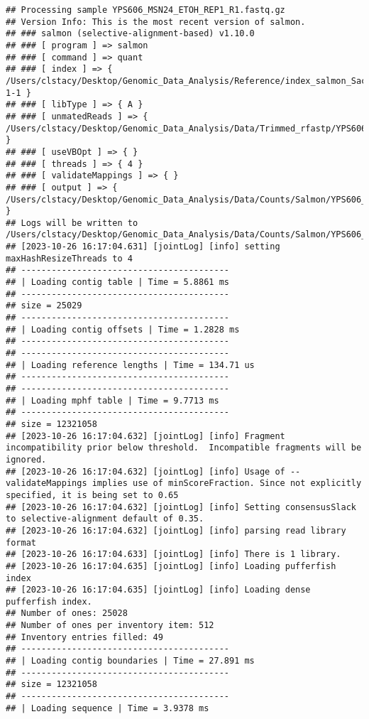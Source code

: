 \documentclass[
]{book}
\begin{document}
\begin{verbatim}
## Processing sample YPS606_MSN24_ETOH_REP1_R1.fastq.gz
## Version Info: This is the most recent version of salmon.
## ### salmon (selective-alignment-based) v1.10.0
## ### [ program ] => salmon 
## ### [ command ] => quant 
## ### [ index ] => { /Users/clstacy/Desktop/Genomic_Data_Analysis/Reference/index_salmon_Saccharomyces_cerevisiae.R64-1-1 }
## ### [ libType ] => { A }
## ### [ unmatedReads ] => { /Users/clstacy/Desktop/Genomic_Data_Analysis/Data/Trimmed_rfastp/YPS606_MSN24_ETOH_REP1_R1.fastq.gz }
## ### [ useVBOpt ] => { }
## ### [ threads ] => { 4 }
## ### [ validateMappings ] => { }
## ### [ output ] => { /Users/clstacy/Desktop/Genomic_Data_Analysis/Data/Counts/Salmon/YPS606_MSN24_ETOH_REP1_R1.fastq.gz_quant }
## Logs will be written to /Users/clstacy/Desktop/Genomic_Data_Analysis/Data/Counts/Salmon/YPS606_MSN24_ETOH_REP1_R1.fastq.gz_quant/logs
## [2023-10-26 16:17:04.631] [jointLog] [info] setting maxHashResizeThreads to 4
## -----------------------------------------
## | Loading contig table | Time = 5.8861 ms
## -----------------------------------------
## size = 25029
## -----------------------------------------
## | Loading contig offsets | Time = 1.2828 ms
## -----------------------------------------
## -----------------------------------------
## | Loading reference lengths | Time = 134.71 us
## -----------------------------------------
## -----------------------------------------
## | Loading mphf table | Time = 9.7713 ms
## -----------------------------------------
## size = 12321058
## [2023-10-26 16:17:04.632] [jointLog] [info] Fragment incompatibility prior below threshold.  Incompatible fragments will be ignored.
## [2023-10-26 16:17:04.632] [jointLog] [info] Usage of --validateMappings implies use of minScoreFraction. Since not explicitly specified, it is being set to 0.65
## [2023-10-26 16:17:04.632] [jointLog] [info] Setting consensusSlack to selective-alignment default of 0.35.
## [2023-10-26 16:17:04.632] [jointLog] [info] parsing read library format
## [2023-10-26 16:17:04.633] [jointLog] [info] There is 1 library.
## [2023-10-26 16:17:04.635] [jointLog] [info] Loading pufferfish index
## [2023-10-26 16:17:04.635] [jointLog] [info] Loading dense pufferfish index.
## Number of ones: 25028
## Number of ones per inventory item: 512
## Inventory entries filled: 49
## -----------------------------------------
## | Loading contig boundaries | Time = 27.891 ms
## -----------------------------------------
## size = 12321058
## -----------------------------------------
## | Loading sequence | Time = 3.9378 ms

\end{verbatim}
\end{document}

